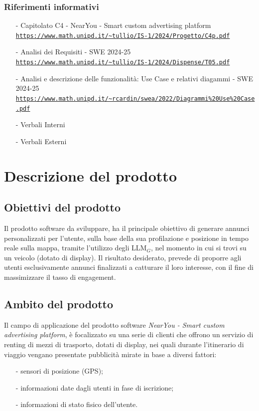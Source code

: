 \documentclass[11pt]{article}
\begin{document}
\begin{justify}
\subsubsection{Riferimenti informativi}
\begin{itemize}
    \item[-] Capitolato C4 - NearYou - Smart custom advertising platform\\
    \textcolor{blue}{\texttt{\url{https://www.math.unipd.it/~tullio/IS-1/2024/Progetto/C4p.pdf}}}
    \item[-] Analisi dei Requisiti - SWE 2024-25\\
    \textcolor{blue}{\texttt{\url{https://www.math.unipd.it/~tullio/IS-1/2024/Dispense/T05.pdf}}}
    \item[-] Analisi e descrizione delle funzionalità: Use Case e relativi diagammi - SWE 2024-25\\    
    \textcolor{blue}{\texttt{\url{https://www.math.unipd.it/~rcardin/swea/2022/Diagrammi\%20Use\%20Case.pdf}}}
    \item[-] Verbali Interni
    \item[-] Verbali Esterni
    
\end{itemize}

\newpage
\section{Descrizione del prodotto}
\label{sec:descrizione}
\subsection{Obiettivi del prodotto}
Il prodotto software da sviluppare, ha il principale obiettivo di generare annunci personalizzati per l'utente, sulla base della sua profilazione e posizione in tempo reale sulla mappa, tramite l'utilizzo degli LLM$_G$, nel momento in cui si trovi su un veicolo (dotato di display). Il risultato desiderato, prevede di proporre agli utenti esclusivamente annunci finalizzati a catturare il loro interesse, con il fine di massimizzare il tasso di engagement.

\subsection{Ambito del prodotto}
Il campo di applicazione del prodotto software \textit{NearYou - 
Smart custom advertising platform}, è focalizzato su una serie di clienti che offrono un servizio di renting di mezzi di trasporto, dotati di display, nei quali durante l'itinerario di viaggio vengano presentate pubblicità mirate in base a diversi fattori:
\begin{itemize}
    \item [-] sensori di posizione (GPS);
    \item [-] informazioni date dagli utenti in fase di iscrizione;
    \item [-] informazioni di stato fisico dell’utente.
\end{itemize}


\end{justify}
\end{document}

